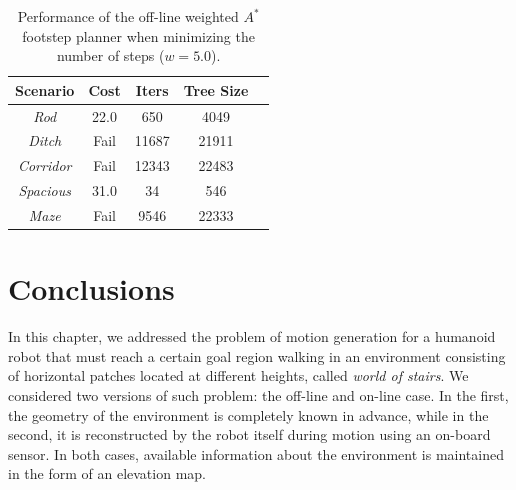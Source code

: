 \begin{table}
    \centering
    \begin{tabular}{*{5}{c}}
        Scenario & Cost & Iters & Tree Size \\
        \hline
        \textit{Rod} & 22.0 & 650 & 4049 \\
        \textit{Ditch} & Fail & 11687 & 21911 \\
        \textit{Corridor} & Fail & 12343 & 22483 \\
        \textit{Spacious} & 31.0 & 34 & 546 \\
        \textit{Maze} & Fail & 9546 & 22333
    \end{tabular}
    \caption{Performance of the off-line weighted $A^\ast$ footstep planner
        when minimizing the number of steps ($w=5.0$).}
    \label{tab:benchmark-wastar-w5}
\end{table}


\section{Conclusions}
\label{sec:WoS:Conclusions}
In this chapter, we addressed the problem of motion generation for a humanoid
robot that must reach a certain goal region walking in an environment consisting
of horizontal patches located at different heights, called \textit{world of stairs}.
We considered two versions of such problem: the off-line and on-line case. 
In the first, the geometry of the environment is completely known in advance,
while in the second, it is reconstructed by the robot itself during motion using
an on-board sensor. In both cases, available information about the environment
is maintained in the form of an elevation map. 

